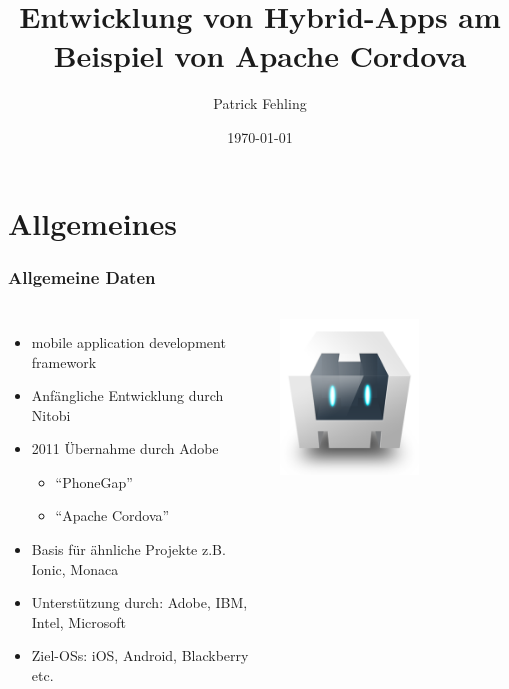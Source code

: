 \documentclass[xcolor=dvipsnames]{beamer}
\title[Entwicklung von Hybrid-Apps am Beispiel von Apache Cordova]{Entwicklung von Hybrid-Apps am Beispiel von Apache Cordova}
\author{Patrick Fehling}
\institute{Hochschule für Technik und Wirtschaft Berlin}
\date{\today}
\begin{document}
\maketitle
\frame{\tableofcontents}


\section{Allgemeines}

\begin{frame}\frametitle{Allgemeine Daten}
	\begin{columns}[t,onlytextwidth]
		\begin{itemize}
			\item mobile application development framework
			\item Anfängliche Entwicklung durch Nitobi
			\item 2011 Übernahme durch Adobe
			\begin{itemize}
				\item "`PhoneGap"'
				\item "`Apache Cordova"'
			\end{itemize}
			\item Basis für ähnliche Projekte z.B. Ionic, Monaca
			\item Unterstützung durch: Adobe, IBM, Intel, Microsoft
			\item Ziel-OSs: iOS, Android, Blackberry etc.
		\end{itemize}
		\centering
		
		\includegraphics[width=0.6\textwidth]{pictures/cordova_logo}
		

\end{columns}
\end{frame}
\end{document}
